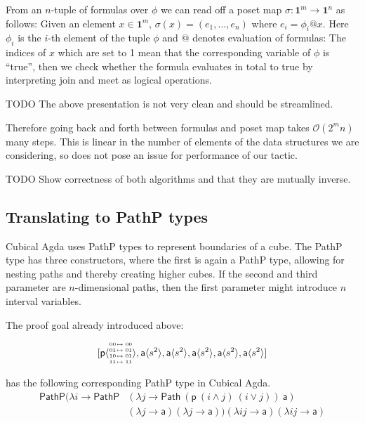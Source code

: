 \documentclass{llncs}
\newcommand{\continuation}{??}
\newenvironment{examplecontd}[1]
{\renewcommand{\continuation}{\ref{#1}}\expcont[continued]}
{\endexpcont}
\newcommand{\todo}[1]{
  \begin{tcolorbox}
    TODO {#1} 
  \end{tcolorbox}
}
\newcommand{\mlist}[1]{[ {#1} ]}
\newcommand{\pint}[1]{\mathbf{1}^{#1}}
\newcommand{\smap}[1]{s^{{#1}}}
\newcommand{\cont}[2]{\ensuremath{ \ifthenelse{\equal{#2}{}}{#1}{{#1}\langle{#2}\rangle}} }
\newcommand{\cset}[1]{\ensuremath{\mathsf{{#1}}}}
\newcommand{\substfour}[4]{\tiny
  \arraycolsep=.4pt\def\arraystretch{1}
  \begin{array}{ll}
    00 &\mapsto {#1} \\
    01 &\mapsto {#2} \\
    10 &\mapsto {#3} \\
    11 &\mapsto {#4} 
  \end{array}
}
\begin{document}
From an $n$-tuple of formulas over $\phi$ we can read off a poset map $\sigma :
\pint{m} \to \pint{n}$ as follows: Given an element $x \in \pint{m}$, $\sigma(x) = (e_1
, ... , e_n) $ where $e_i = \phi_i @ x$. Here $\phi_i$ is the $i$-th element of
the tuple $\phi$ and $@$ denotes evaluation of formulas: The indices of $x$
which are set to 1 mean that the corresponding variable of $\phi$ is ``true'',
then we check whether the formula evaluates in total to true by interpreting
join and meet as logical operations.

\todo{The above presentation is not very clean and should be streamlined.}

Therefore going back and forth between formulas and poset map takes
$\mathcal{O}(2^mn)$ many steps. This is linear in the number of elements of the
data structures we are considering, so does not pose an issue for performance of
our tactic.


\todo{Show correctness of both algorithms and that they are mutually inverse.}

\subsection{Translating to PathP types}

Cubical Agda uses PathP types to represent boundaries of a cube. The PathP type
has three constructors, where the first is again a PathP type, allowing for
nesting paths and thereby creating higher cubes. If the second and third
parameter are $n$-dimensional paths, then the first parameter might introduce
$n$ interval variables.


\begin{examplecontd}{exp:sndsphere}
  
The proof goal already introduced above:

$$\mlist{ \cont{\cset{p}}{\substfour{00}{01}{01}{11}} ,
  \cont{\cset{a}}{\smap{2}} , \cont{\cset{a}}{\smap{2}} ,
  \cont{\cset{a}}{\smap{2}} , \cont{\cset{a}}{\smap{2}} ,
  \cont{\cset{a}}{\smap{2}}}$$

has the following corresponding PathP type in Cubical Agda.
  \begin{align*}
    \mathsf{PathP} (\lambda i \to \mathsf{PathP} &(\lambda j \to  \mathsf{Path} \ (\cset{p} \ (i \wedge
                                                   j) \ (i \vee j))\ \cset{a})\\
                                                 &(\lambda j \to \cset{a}) (\lambda j \to \cset{a}))
                                                   (\lambda i j \to \cset{a}) (\lambda i j \to \cset{a})
  \end{align*}
\end{examplecontd}
\end{document}
